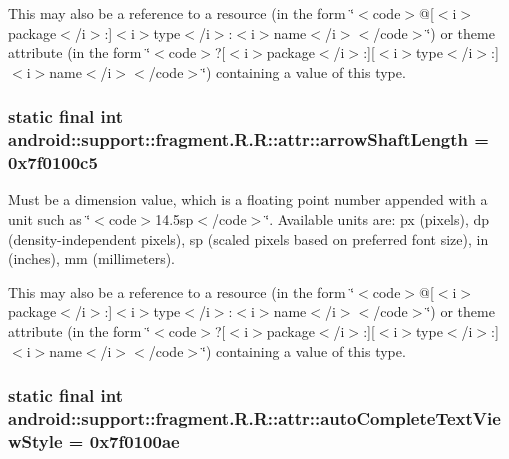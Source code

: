 This may also be a reference to a resource (in the form \char`\"{}$<$code$>$@\mbox{[}$<$i$>$package$<$/i$>$:\mbox{]}$<$i$>$type$<$/i$>$:$<$i$>$name$<$/i$>$$<$/code$>$\char`\"{}) or theme attribute (in the form \char`\"{}$<$code$>$?\mbox{[}$<$i$>$package$<$/i$>$:\mbox{]}\mbox{[}$<$i$>$type$<$/i$>$:\mbox{]}$<$i$>$name$<$/i$>$$<$/code$>$\char`\"{}) containing a value of this type. \hypertarget{classandroid_1_1support_1_1fragment_1_1_r_1_1attr_ef27d57d98878375f0d2d7e54ea21ace}{
\subsubsection[{arrowShaftLength}]{\setlength{\rightskip}{0pt plus 5cm}static final int android::support::fragment.R.R::attr::arrowShaftLength = 0x7f0100c5}}
\label{classandroid_1_1support_1_1fragment_1_1_r_1_1attr_ef27d57d98878375f0d2d7e54ea21ace}


Must be a dimension value, which is a floating point number appended with a unit such as \char`\"{}$<$code$>$14.5sp$<$/code$>$\char`\"{}. Available units are: px (pixels), dp (density-independent pixels), sp (scaled pixels based on preferred font size), in (inches), mm (millimeters). 

This may also be a reference to a resource (in the form \char`\"{}$<$code$>$@\mbox{[}$<$i$>$package$<$/i$>$:\mbox{]}$<$i$>$type$<$/i$>$:$<$i$>$name$<$/i$>$$<$/code$>$\char`\"{}) or theme attribute (in the form \char`\"{}$<$code$>$?\mbox{[}$<$i$>$package$<$/i$>$:\mbox{]}\mbox{[}$<$i$>$type$<$/i$>$:\mbox{]}$<$i$>$name$<$/i$>$$<$/code$>$\char`\"{}) containing a value of this type. \hypertarget{classandroid_1_1support_1_1fragment_1_1_r_1_1attr_c5259b9a784dedf5f3cdb012dc7e5950}{
\subsubsection[{autoCompleteTextViewStyle}]{\setlength{\rightskip}{0pt plus 5cm}static final int android::support::fragment.R.R::attr::autoCompleteTextViewStyle = 0x7f0100ae}}
\label{classandroid_1_1support_1_1fragment_1_1_r_1_1attr_c5259b9a784dedf5f3cdb012dc7e5950}


